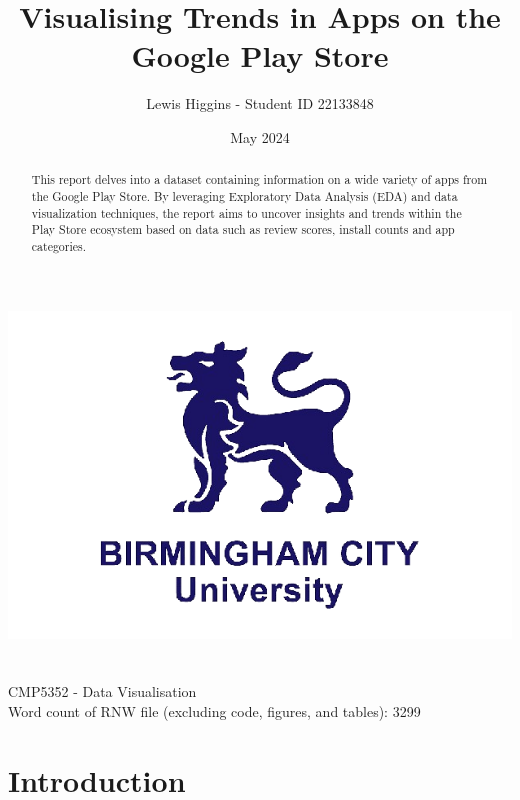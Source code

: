 \documentclass[12pt]{report}\usepackage[]{graphicx}\usepackage[]{xcolor}
\title{Visualising Trends in Apps on the Google Play Store}
\author{Lewis Higgins - Student ID 22133848}
\date{May 2024}
\begin{document}
\makeatletter
\begin{titlepage}
    \begin{center}
        \includegraphics[width=0.7\linewidth]{bcu logo}\\[7ex]
        {\huge \bfseries  \@title }\\[30ex]
        {\@author}\\[2ex]
        {CMP5352 - Data Visualisation}\\[10ex]
        {Word count of RNW file (excluding code, figures, and tables): 3299}\\[10ex]
    \end{center}
\end{titlepage}
\makeatother
\thispagestyle{empty}
\newpage

\begin{abstract}

    This report delves into a dataset containing information
    on a wide variety of apps from the Google Play Store. 
    By leveraging Exploratory Data Analysis (EDA) and data visualization techniques, 
    the report aims to uncover insights and trends within 
    the Play Store ecosystem based on data such as review scores, install counts and app
    categories.

\end{abstract} 

\setcounter{page}{0}

\tableofcontents
\thispagestyle{empty}

\chapter*{Introduction}
\end{document}
